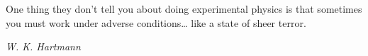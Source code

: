 \vspace*{6cm}



{\LARGE One thing they don't tell you about doing experimental physics is that sometimes you must work under adverse conditions\ldots{} like a state of sheer terror.}

\hfill {\large \emph{W. K. Hartmann}}






